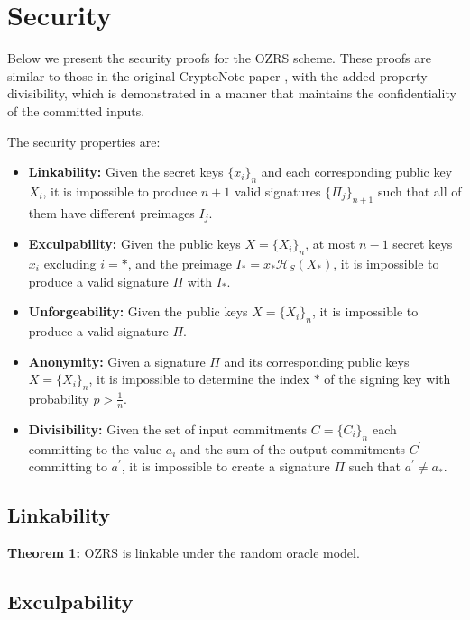 \documentclass{article}
\newcommand{\sidx}{\ensuremath{*}}
\newcommand{\ix}{\ensuremath{x_i}}
\newcommand{\sx}{\ensuremath{x_\sidx}}
\newcommand{\ipk}{\ensuremath{X_i}}
\newcommand{\spk}{\ensuremath{X_\sidx}}
\newcommand{\iC}{\ensuremath{C_i}}
\newcommand{\oC}{\ensuremath{C^\prime}}
\newcommand{\hs}{\ensuremath{\mathcal{H}_S}}
\begin{document}
\section{Security}

Below we present the security proofs for the OZRS scheme.  These proofs are
similar to those in the original CryptoNote paper \cite{S13}, with the added
property divisibility, which is demonstrated in a manner that maintains the
confidentiality of the committed inputs.

The security properties are:
\begin{itemize}
  \item {\bf Linkability:} Given the secret keys $\{\ix\}_n$ and each
  corresponding public key {\ipk}, it is impossible to produce $n+1$ valid
  signatures $\{\Pi_j\}_{n+1}$ such that all of them have different preimages
  $I_j$.

  \item {\bf Exculpability:} Given the public keys $X=\{\ipk\}_n$, at most
  $n-1$ secret keys {\ix} excluding $i = *$, and the preimage $I_*=\sx
  \hs(\spk)$, it is impossible to produce a valid signature $\Pi$ with $I_*$.

  \item {\bf Unforgeability:} Given the public keys $X=\{\ipk\}_n$, it is
  impossible to produce a valid signature $\Pi$.
  
  \item {\bf Anonymity:} Given a signature $\Pi$ and its corresponding public
  keys $X=\{\ipk\}_n$, it is impossible to determine the index $*$ of the signing
  key with probability $p > \frac{1}{n}$.

  \item {\bf Divisibility:} Given the set of input commitments $C=\{\iC\}_n$
  each committing to the value $a_i$ and the sum of the output commitments {\oC}
  committing to $a^\prime$, it is impossible to create a signature $\Pi$ such
  that $a^\prime \neq a_*$.

\end{itemize}

\subsection{Linkability}

{\bf Theorem 1:} OZRS is linkable under the random oracle model.

\subsection{Exculpability}
\end{document}
